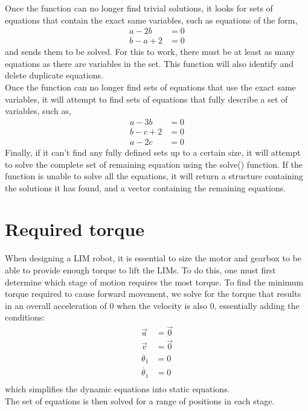 Once the function can no longer find trivial solutions, it looks for sets of equations that contain the exact same variables, such as equations of the form,
\begin{subequations}
	\begin{align}
		a -2b &= 0\\
		b -a +2 &= 0 
	\end{align}
\end{subequations}
and sends them to be solved. For this to work, there must be at least as many equations as there are variables in the set. This function will also identify and delete duplicate equations.\\
Once the function can no longer find sets of equations that use the exact same variables, it will attempt to find sets of equations that fully describe a set of variables, such as,
\begin{subequations}
	\begin{align}
		a -3b &= 0\\
		b -c +2&= 0\\
		a -2c &= 0
	\end{align}
\end{subequations}
Finally, if it can't find any fully defined sets up to a certain size, it will attempt to solve the complete set of remaining equation using the solve() function. If the function is unable to solve all the equations, it will return a structure containing the solutions it has found, and a vector containing the remaining equations.


\section{Required torque}
When designing a LIM robot, it is essential to size the motor and gearbox to be able to provide enough torque to lift the LIMs. To do this, one must first determine which stage of motion requires the most torque. To find the minimum torque required to cause forward movement, we solve for the torque that results in an overall acceleration of 0 when the velocity is also 0, essentially adding the conditions:
\begin{subequations}
	\label{condition-static}
	\begin{align}
		\vec{a} &= \vec{0}\\
		\vec{v} &= \vec{0}\\
		\ddot{\theta_1} &= 0\\
		\dot{\theta_1} &= 0\\
	\end{align}
\end{subequations}
which simplifies the dynamic equations into static equations.\\
The set of equations is then solved for a range of positions in each stage.
